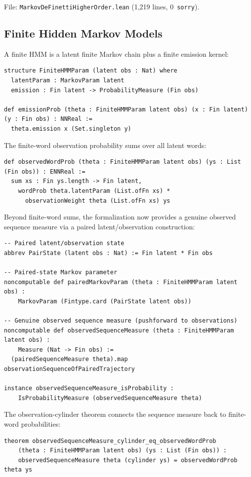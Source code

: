 \documentclass[11pt,a4paper]{article}
\theoremstyle{definition}
\begin{document}
File: \texttt{MarkovDeFinettiHigherOrder.lean} (1,219 lines, 0~\texttt{sorry}).

\subsection{Finite Hidden Markov Models}

A finite HMM is a latent finite Markov chain plus a finite emission kernel:

\begin{lstlisting}
structure FiniteHMMParam (latent obs : Nat) where
  latentParam : MarkovParam latent
  emission : Fin latent -> ProbabilityMeasure (Fin obs)

def emissionProb (theta : FiniteHMMParam latent obs) (x : Fin latent) (y : Fin obs) : NNReal :=
  theta.emission x (Set.singleton y)
\end{lstlisting}

The finite-word observation probability sums over all latent words:

\begin{lstlisting}
def observedWordProb (theta : FiniteHMMParam latent obs) (ys : List (Fin obs)) : ENNReal :=
  sum xs : Fin ys.length -> Fin latent,
    wordProb theta.latentParam (List.ofFn xs) *
      observationWeight theta (List.ofFn xs) ys
\end{lstlisting}

Beyond finite-word sums, the formalization now provides a genuine observed
sequence measure via a paired latent/observation construction:

\begin{lstlisting}
-- Paired latent/observation state
abbrev PairState (latent obs : Nat) := Fin latent * Fin obs

-- Paired-state Markov parameter
noncomputable def pairedMarkovParam (theta : FiniteHMMParam latent obs) :
    MarkovParam (Fintype.card (PairState latent obs))

-- Genuine observed sequence measure (pushforward to observations)
noncomputable def observedSequenceMeasure (theta : FiniteHMMParam latent obs) :
    Measure (Nat -> Fin obs) :=
  (pairedSequenceMeasure theta).map observationSequenceOfPairedTrajectory

instance observedSequenceMeasure_isProbability :
    IsProbabilityMeasure (observedSequenceMeasure theta)
\end{lstlisting}

The observation-cylinder theorem connects the sequence measure back to
finite-word probabilities:
\begin{lstlisting}
theorem observedSequenceMeasure_cylinder_eq_observedWordProb
    (theta : FiniteHMMParam latent obs) (ys : List (Fin obs)) :
    observedSequenceMeasure theta (cylinder ys) = observedWordProb theta ys
\end{lstlisting}
\end{document}
